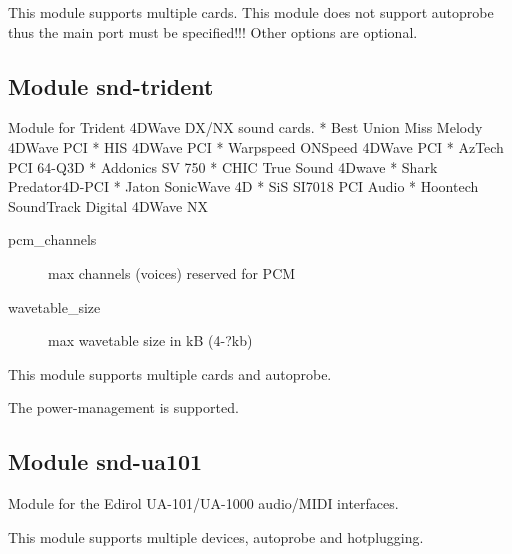 \documentclass[a4paper,8pt,english]{sphinxmanual}
\begin{document}
This module supports multiple cards. This module does not support autoprobe
thus the main port must be specified!!! Other options are optional.


\subsection{Module snd-trident}
\label{sound/alsa-configuration:module-snd-trident}
Module for Trident 4DWave DX/NX sound cards.
* Best Union  Miss Melody 4DWave PCI
* HIS  4DWave PCI
* Warpspeed  ONSpeed 4DWave PCI
* AzTech  PCI 64-Q3D
* Addonics  SV 750
* CHIC  True Sound 4Dwave
* Shark  Predator4D-PCI
* Jaton  SonicWave 4D
* SiS SI7018 PCI Audio
* Hoontech SoundTrack Digital 4DWave NX
\begin{description}
\item[{pcm\_channels}] \leavevmode
max channels (voices) reserved for PCM

\item[{wavetable\_size}] \leavevmode
max wavetable size in kB (4-?kb)

\end{description}

This module supports multiple cards and autoprobe.

The power-management is supported.


\subsection{Module snd-ua101}
\label{sound/alsa-configuration:module-snd-ua101}
Module for the Edirol UA-101/UA-1000 audio/MIDI interfaces.

This module supports multiple devices, autoprobe and hotplugging.
\end{document}
